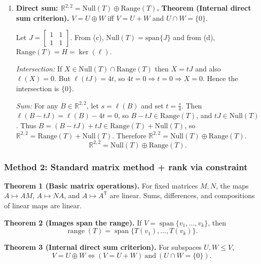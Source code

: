 \documentclass[12pt]{article}
\newcommand{\R}{\mathbb{R}}
\DeclareMathOperator{\range}{range}
\begin{document}
\begin{enumerate}[label=(\alph*)]
\item \textbf{Direct sum: $\R^{2,2}=\mathrm{Null}(T)\oplus\mathrm{Range}(T)$.}
\textbf{Theorem (Internal direct sum criterion).} $V=U\oplus W$ iff $V=U+W$ and $U\cap W=\{0\}$.

Let $J=\begin{bmatrix}1&1\\1&1\end{bmatrix}$. From (c), $\mathrm{Null}(T)=\mathrm{span}\{J\}$ and from (d), $\mathrm{Range}(T)=H=\ker(\ell)$.

\emph{Intersection:} If $X\in \mathrm{Null}(T)\cap \mathrm{Range}(T)$ then $X=tJ$ and also $\ell(X)=0$.
But $\ell(tJ)=4t$, so $4t=0\Rightarrow t=0\Rightarrow X=0$. Hence the intersection is $\{0\}$.

\emph{Sum:} For any $B\in \R^{2,2}$, let $s=\ell(B)$ and set $t=\frac{s}{4}$.
Then $\ell(B-tJ)=\ell(B)-4t=0$, so $B-tJ\in \mathrm{Range}(T)$, and $tJ\in \mathrm{Null}(T)$.
Thus $B=(B-tJ)+tJ\in \mathrm{Range}(T)+\mathrm{Null}(T)$, so $\R^{2,2}=\mathrm{Range}(T)+\mathrm{Null}(T)$.
Therefore $\R^{2,2}=\mathrm{Null}(T)\oplus\mathrm{Range}(T)$.
\[
\boxed{\,\R^{2,2}=\mathrm{Null}(T)\oplus \mathrm{Range}(T).\,}
\]
\end{enumerate}

\newpage
\subsubsection{Method 2: Standard matrix method + rank via constraint}

\medskip

\noindent\textbf{Theorem 1 (Basic matrix operations).}
For fixed matrices $M,N$, the maps $A\mapsto AM$, $A\mapsto NA$, and
$A\mapsto A^{\mathsf T}$ are linear. Sums, differences, and compositions of
linear maps are linear.

\medskip
\noindent\textbf{Theorem 2 (Images span the range).}
If $V=\operatorname{span}\{v_1,\dots,v_k\}$, then
\[
\range(T)=\operatorname{span}\{T(v_1),\dots,T(v_k)\}.
\]

\medskip
\noindent\textbf{Theorem 3 (Internal direct sum criterion).}
For subspaces $U,W\le V$,
\[
V=U\oplus W \iff (V=U+W)\ \text{and}\ (U\cap W=\{0\}).
\]
\end{document}

